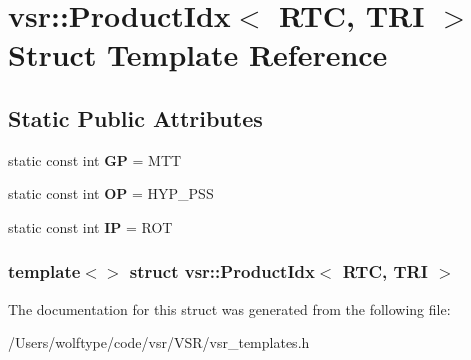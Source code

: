\hypertarget{structvsr_1_1_product_idx_3_01_r_t_c_00_01_t_r_i_01_4}{\section{vsr\-:\-:Product\-Idx$<$ R\-T\-C, T\-R\-I $>$ Struct Template Reference}
\label{structvsr_1_1_product_idx_3_01_r_t_c_00_01_t_r_i_01_4}
}
\subsection*{Static Public Attributes}
\begin{DoxyCompactItemize}
\item 
\hypertarget{structvsr_1_1_product_idx_3_01_r_t_c_00_01_t_r_i_01_4_a9571742e7269c1f455b4bf6e37f05650}{static const int {\bfseries G\-P} = M\-T\-T}\label{structvsr_1_1_product_idx_3_01_r_t_c_00_01_t_r_i_01_4_a9571742e7269c1f455b4bf6e37f05650}

\item 
\hypertarget{structvsr_1_1_product_idx_3_01_r_t_c_00_01_t_r_i_01_4_af7790236535b28a4f57cf61ef876270c}{static const int {\bfseries O\-P} = H\-Y\-P\-\_\-\-P\-S\-S}\label{structvsr_1_1_product_idx_3_01_r_t_c_00_01_t_r_i_01_4_af7790236535b28a4f57cf61ef876270c}

\item 
\hypertarget{structvsr_1_1_product_idx_3_01_r_t_c_00_01_t_r_i_01_4_a51ec78d82f6d1b9bf044f348b8d18cdc}{static const int {\bfseries I\-P} = R\-O\-T}\label{structvsr_1_1_product_idx_3_01_r_t_c_00_01_t_r_i_01_4_a51ec78d82f6d1b9bf044f348b8d18cdc}

\end{DoxyCompactItemize}
\subsubsection*{template$<$$>$ struct vsr\-::\-Product\-Idx$<$ R\-T\-C, T\-R\-I $>$}



The documentation for this struct was generated from the following file\-:\begin{DoxyCompactItemize}
\item 
/\-Users/wolftype/code/vsr/\-V\-S\-R/vsr\-\_\-templates.\-h\end{DoxyCompactItemize}
